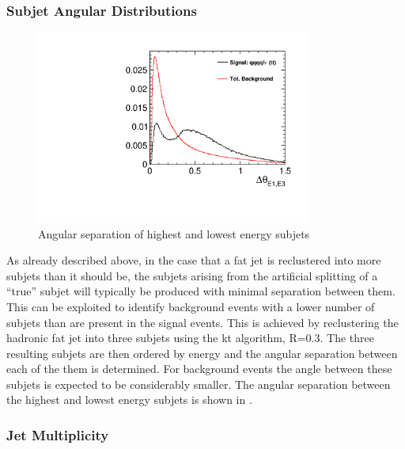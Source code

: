 \subsubsection{Subjet Angular Distributions}
\label{subjAngular}
\begin{figure}
  \centering
  \includegraphics[width=0.8\textwidth]{TopAnalysis/figures/HighELowEDira.pdf}
  \caption[Angular separation of highest and lowest energy subjets]{Angular separation of highest and lowest energy subjets}
  \label{fig:angularrelations}
\end{figure}


As already described above, in the case that a fat jet is reclustered into more subjets than it should be, the subjets arising from the artificial splitting of a ``true'' subjet will typically be produced with minimal separation between them. This can be exploited to identify background events with a lower number of subjets than are present in the signal events. This is achieved by reclustering the hadronic fat jet into three subjets using the kt algorithm, R=0.3. The three resulting subjets are then ordered by energy and the angular separation between each of the them is determined. For background events the angle between these subjets is expected to be considerably smaller. The angular separation between the highest and lowest energy subjets is shown in .



\subsubsection{Jet Multiplicity}
\label{Jet Multiplicity}

